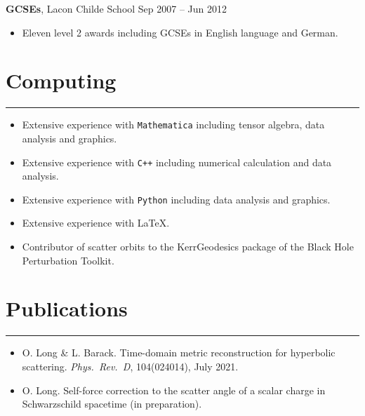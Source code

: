 \documentclass[10.5pt, oneside]{article}   	%
\begin{document}
\textbf{GCSEs}, Lacon Childe School \hfill Sep 2007 -- Jun 2012\\
\vspace{-5mm}
\begin{itemize}
\item Eleven level 2 awards including GCSEs in English language and German.
\end{itemize} 

 {\color{Sectioncolour}
\section*{Computing}
\vspace{-3mm}
\noindent\rule{\linewidth}{0.6pt}}
 \begin{itemize}
\item Extensive experience with \texttt{Mathematica} including tensor algebra, data analysis and graphics. 
\item Extensive experience with \texttt{C++} including numerical calculation and data analysis.
\item Extensive experience with \texttt{Python} including data analysis and graphics. 
\item Extensive experience with \LaTeX.
\item Contributor of scatter orbits to the KerrGeodesics package of the Black Hole Perturbation Toolkit. \href{http://bhptoolkit.org/}{}
\end{itemize}
 

{\color{Sectioncolour}
\section*{Publications}
\vspace{-3mm}
\noindent\rule{\linewidth}{0.6pt}}
\begin{itemize}
\item O. Long \& L. Barack. Time-domain metric reconstruction for hyperbolic scattering. {\it Phys.\ Rev.\ D}, 104(024014), July 2021. \href{https://journals.aps.org/prd/abstract/10.1103/PhysRevD.104.024014}{}
\item O. Long. Self-force correction to the scatter angle of a scalar charge in Schwarzschild spacetime (in preparation).
\end{itemize} 
\end{document}
